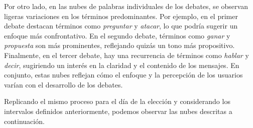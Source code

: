 \documentclass[10pt, a4paper]{article}
\begin{document}
	Por otro lado, en las nubes de palabras individuales de los debates, se observan ligeras variaciones en los términos predominantes. Por ejemplo, en el primer debate destacan términos como \textit{preguntar} y \textit{atacar}, lo que podría sugerir un enfoque más confrontativo. En el segundo debate, términos como \textit{ganar} y \textit{propuesta} son más prominentes, reflejando quizás un tono más propositivo. Finalmente, en el tercer debate, hay una recurrencia de términos como \textit{hablar} y \textit{decir}, sugiriendo un interés en la claridad y el contenido de los mensajes. En conjunto, estas nubes reflejan cómo el enfoque y la percepción de los usuarios varían con el desarrollo de los debates.
	
	Replicando el mismo proceso para el día de la elección y considerando los intervalos definidos anteriormente, podemos observar las nubes descritas a continuación.
	
\end{document}
